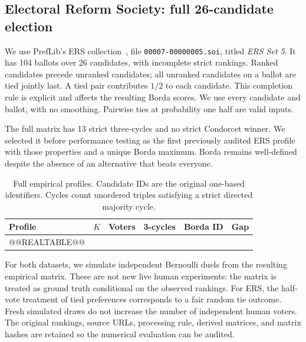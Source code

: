 \documentclass[11pt,a4paper]{article}
\begin{document}
\subsection{Electoral Reform Society: full 26-candidate election}
We use PrefLib's ERS collection~\cite{preflib,ers}, file \texttt{00007-00000005.soi}, titled \emph{ERS Set 5}. It has 104 ballots over 26 candidates, with incomplete strict rankings. Ranked candidates precede unranked candidates; all unranked candidates on a ballot are tied jointly last. A tied pair contributes $1/2$ to each candidate. This completion rule is explicit and affects the resulting Borda scores. We use every candidate and ballot, with no smoothing. Pairwise ties at probability one half are valid inputs.

The full matrix has 13 strict three-cycles and no strict Condorcet winner. We selected it before performance testing as the first previously audited ERS profile with those properties and a unique Borda maximum. Borda remains well-defined despite the absence of an alternative that beats everyone.

\begin{table}[!htbp]\centering\small\begin{tabular}{lrrrrr}\toprule
Profile&$K$&Voters&3-cycles&Borda ID&Gap\\\midrule
@@REALTABLE@@
\bottomrule\end{tabular}\caption{Full empirical profiles. Candidate IDs are the original one-based identifiers. Cycles count unordered triples satisfying a strict directed majority cycle.}\label{tab:real}\end{table}

For both datasets, we simulate independent Bernoulli duels from the resulting empirical matrix. These are not new live human experiments: the matrix is treated as ground truth conditional on the observed rankings. For ERS, the half-vote treatment of tied preferences corresponds to a fair random tie outcome. Fresh simulated draws do not increase the number of independent human voters. The original rankings, source URLs, processing rule, derived matrices, and matrix hashes are retained so the numerical evaluation can be audited.
\end{document}
